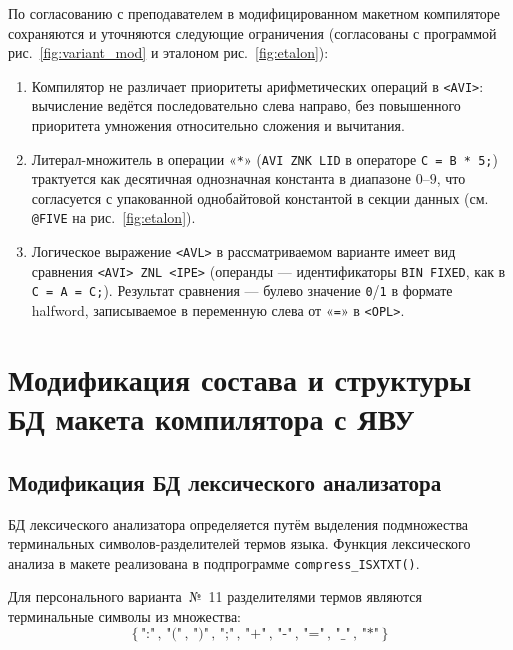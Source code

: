 \documentclass[a4paper,14pt]{extarticle}
\begin{document}
По согласованию с преподавателем в модифицированном макетном компиляторе сохраняются
и уточняются следующие ограничения (согласованы с программой рис.~\ref{fig:variant_mod} и эталоном рис.~\ref{fig:etalon}):

\begin{enumerate}
  \item Компилятор не различает приоритеты арифметических операций в \texttt{<AVI>}: вычисление
        ведётся последовательно слева направо, без повышенного приоритета умножения относительно
        сложения и вычитания.

  \item Литерал-множитель в операции «\texttt{*}» (\texttt{AVI ZNK LID} в операторе \texttt{C = B * 5;})
        трактуется как десятичная однозначная константа в диапазоне $0$--$9$, что согласуется с
        упакованной однобайтовой константой в секции данных (см. \texttt{@FIVE} на рис.~\ref{fig:etalon}).

  \item Логическое выражение \texttt{<AVL>} в рассматриваемом варианте имеет вид сравнения
        \texttt{<AVI> ZNL <IPE>} (операнды — идентификаторы \texttt{BIN FIXED}, как в \texttt{C = A = C;}).
        Результат сравнения — булево значение \texttt{0}/\texttt{1} в формате halfword, записываемое в переменную
        слева от «\texttt{=}» в \texttt{<OPL>}.
\end{enumerate}

\section{Модификация состава и структуры БД макета компилятора с ЯВУ}

\subsection{Модификация БД лексического анализатора}

БД лексического анализатора определяется путём выделения подмножества терминальных
символов-разделителей термов языка. Функция лексического анализа в макете реализована
в подпрограмме \texttt{compress\_ISXTXT()}.

Для персонального варианта~№~11 разделителями термов являются терминальные символы
из множества:
\[
  \{\,\texttt{":"}\,,\, \texttt{"("}\,,\, \texttt{")"}\,,\, \texttt{";"}\,,\,
     \texttt{"+"}\,,\, \texttt{"-"}\,,\, \texttt{"="}\,,\, \texttt{"\_"}\,,\,
     \texttt{"*"}\,\}
\]
\end{document}
